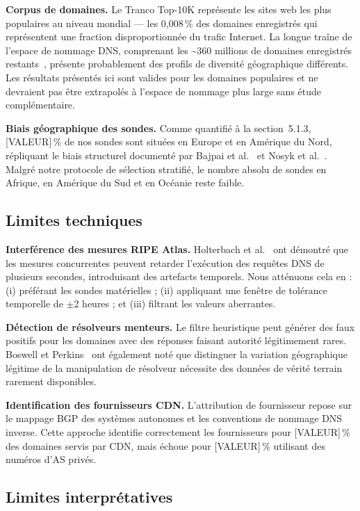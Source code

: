 \textbf{Corpus de domaines.}
Le Tranco Top-10K représente les sites web les plus populaires au niveau mondial --- les 0,008\,\% des domaines enregistrés qui représentent une fraction disproportionnée du trafic Internet. La longue traîne de l'espace de nommage DNS, comprenant les \textasciitilde{}360 millions de domaines enregistrés restants~\cite{vanRijswijk2016}, présente probablement des profils de diversité géographique différents. Les résultats présentés ici sont valides pour les domaines populaires et ne devraient pas être extrapolés à l'espace de nommage plus large sans étude complémentaire.

\textbf{Biais géographique des sondes.}
Comme quantifié à la section~5.1.3, [VALEUR]\,\% de nos sondes sont situées en Europe et en Amérique du Nord, répliquant le biais structurel documenté par Bajpai et al.~\cite{Bajpai2017} et Nosyk et al.~\cite{Nosyk2024}. Malgré notre protocole de sélection stratifié, le nombre absolu de sondes en Afrique, en Amérique du Sud et en Océanie reste faible.
\bigskip
\subsection{Limites techniques}
\label{subsec:5.2.2}

\textbf{Interférence des mesures RIPE Atlas.}
Holterbach et al.~\cite{Holterbach2015} ont démontré que les mesures concurrentes peuvent retarder l'exécution des requêtes DNS de plusieurs secondes, introduisant des artefacts temporels. Nous atténuons cela en : (i) préférant les sondes matérielles ; (ii) appliquant une fenêtre de tolérance temporelle de $\pm$2 heures ; et (iii) filtrant les valeurs aberrantes.

\textbf{Détection de résolveurs menteurs.}
Le filtre heuristique peut générer des faux positifs pour les domaines avec des réponses faisant autorité légitimement rares. Boswell et Perkins~\cite{Boswell2024} ont également noté que distinguer la variation géographique légitime de la manipulation de résolveur nécessite des données de vérité terrain rarement disponibles.

\textbf{Identification des fournisseurs CDN.}
L'attribution de fournisseur repose sur le mappage BGP des systèmes autonomes et les conventions de nommage DNS inverse. Cette approche identifie correctement les fournisseurs pour [VALEUR]\,\% des domaines servis par CDN, mais échoue pour [VALEUR]\,\% utilisant des numéros d'AS privés.
\bigskip
\subsection{Limites interprétatives}
\label{subsec:5.2.3}

